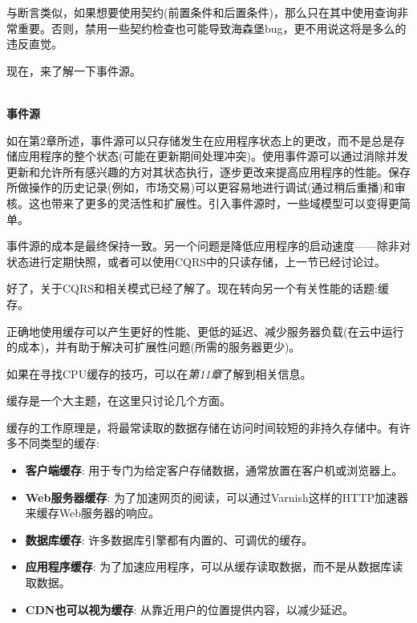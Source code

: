 与断言类似，如果想要使用契约(前置条件和后置条件)，那么只在其中使用查询非常重要。否则，禁用一些契约检查也可能导致海森堡bug，更不用说这将是多么的违反直觉。

现在，来了解一下事件源。

\hspace*{\fill} \\ %
\noindent
\textbf{事件源}

如在第2章所述，事件源可以只存储发生在应用程序状态上的更改，而不是总是存储应用程序的整个状态(可能在更新期间处理冲突)。使用事件源可以通过消除并发更新和允许所有感兴趣的方对其状态执行，逐步更改来提高应用程序的性能。保存所做操作的历史记录(例如，市场交易)可以更容易地进行调试(通过稍后重播)和审核。这也带来了更多的灵活性和扩展性。引入事件源时，一些域模型可以变得更简单。

事件源的成本是最终保持一致。另一个问题是降低应用程序的启动速度——除非对状态进行定期快照，或者可以使用CQRS中的只读存储，上一节已经讨论过。

好了，关于CQRS和相关模式已经了解了。现在转向另一个有关性能的话题:缓存。


正确地使用缓存可以产生更好的性能、更低的延迟、减少服务器负载(在云中运行的成本)，并有助于解决可扩展性问题(所需的服务器更少)。

\begin{tcolorbox}[colback=blue!5!white,colframe=blue!75!black, title=Note]
\hspace*{0.75cm}如果在寻找CPU缓存的技巧，可以在\textit{第11章}了解到相关信息。
\end{tcolorbox}

缓存是一个大主题，在这里只讨论几个方面。

缓存的工作原理是，将最常读取的数据存储在访问时间较短的非持久存储中。有许多不同类型的缓存:

\begin{itemize}
\item 
\textbf{客户端缓存}: 用于专门为给定客户存储数据，通常放置在客户机或浏览器上。

\item 
\textbf{Web服务器缓存}: 为了加速网页的阅读，可以通过Varnish这样的HTTP加速器来缓存Web服务器的响应。

\item
\textbf{数据库缓存}: 许多数据库引擎都有内置的、可调优的缓存。

\item
\textbf{应用程序缓存}: 为了加速应用程序，可以从缓存读取数据，而不是从数据库读取数据。

\item
\textbf{CDN也可以视为缓存}: 从靠近用户的位置提供内容，以减少延迟。
\end{itemize}

